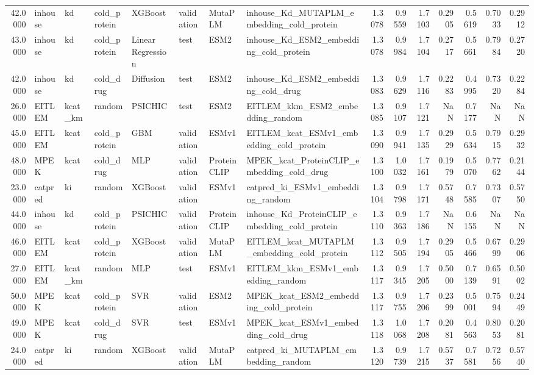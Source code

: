 \begin{tabular}{rlllllllrrrrrrr}
42.0000 & inhouse & kd & cold_protein & XGBoost & validation & MutaPLM & inhouse_Kd_MUTAPLM_embedding_cold_protein & 1.3078 & 0.9559 & 1.7103 & 0.2905 & 0.5619 & 0.7033 & 0.2912 \\
43.0000 & inhouse & kd & cold_protein & Linear Regression & test & ESM2 & inhouse_Kd_ESM2_embedding_cold_protein & 1.3078 & 0.9984 & 1.7104 & 0.2717 & 0.5661 & 0.7984 & 0.2720 \\
42.0000 & inhouse & kd & cold_drug & Diffusion & test & ESM2 & inhouse_Kd_ESM2_embedding_cold_drug & 1.3083 & 0.9629 & 1.7116 & 0.2283 & 0.4995 & 0.7320 & 0.2284 \\
26.0000 & EITLEM & kcat_km & random & PSICHIC & test & ESM2 & EITLEM_kkm_ESM2_embedding_random & 1.3085 & 0.9107 & 1.7121 & NaN & 0.7177 & NaN & NaN \\
45.0000 & EITLEM & kcat & cold_protein & GBM & validation & ESMv1 & EITLEM_kcat_ESMv1_embedding_cold_protein & 1.3090 & 0.9941 & 1.7135 & 0.2929 & 0.5634 & 0.7915 & 0.2932 \\
48.0000 & MPEK & kcat & cold_drug & MLP & validation & ProteinCLIP & MPEK_kcat_ProteinCLIP_embedding_cold_drug & 1.3100 & 1.0032 & 1.7161 & 0.1979 & 0.5070 & 0.7762 & 0.2144 \\
23.0000 & catpred & ki & random & XGBoost & validation & ESMv1 & catpred_ki_ESMv1_embedding_random & 1.3104 & 0.9798 & 1.7171 & 0.5748 & 0.7585 & 0.7307 & 0.5750 \\
44.0000 & inhouse & kd & cold_protein & PSICHIC & validation & ProteinCLIP & inhouse_Kd_ProteinCLIP_embedding_cold_protein & 1.3110 & 0.9363 & 1.7186 & NaN & 0.6155 & NaN & NaN \\
46.0000 & EITLEM & kcat & cold_protein & XGBoost & validation & MutaPLM & EITLEM_kcat_MUTAPLM_embedding_cold_protein & 1.3112 & 0.9505 & 1.7194 & 0.2905 & 0.5466 & 0.6799 & 0.2906 \\
27.0000 & EITLEM & kcat_km & random & MLP & test & ESMv1 & EITLEM_kkm_ESMv1_embedding_random & 1.3117 & 0.9345 & 1.7205 & 0.5000 & 0.7139 & 0.6591 & 0.5002 \\
50.0000 & MPEK & kcat & cold_protein & SVR & validation & ESM2 & MPEK_kcat_ESM2_embedding_cold_protein & 1.3117 & 0.9755 & 1.7206 & 0.2399 & 0.5001 & 0.7594 & 0.2449 \\
49.0000 & MPEK & kcat & cold_drug & SVR & test & ESMv1 & MPEK_kcat_ESMv1_embedding_cold_drug & 1.3118 & 1.0068 & 1.7208 & 0.2081 & 0.4563 & 0.8053 & 0.2081 \\
24.0000 & catpred & ki & random & XGBoost & validation & MutaPLM & catpred_ki_MUTAPLM_embedding_random & 1.3120 & 0.9739 & 1.7215 & 0.5737 & 0.7581 & 0.7256 & 0.5740 \\

\end{tabular}
